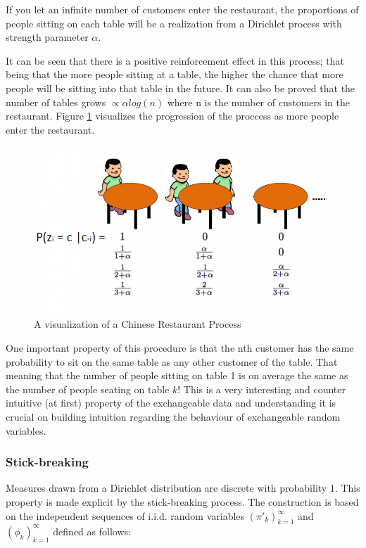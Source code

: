 \documentclass [twoside,hidelinks]{article}
\begin{document}
If you let an infinite number of customers enter the restaurant, the proportions of people sitting on each table will be a realization from a Dirichlet process with strength parameter $\alpha$.

It can be seen that there is a positive reinforcement effect in this process; that being that the more people sitting at a table, the higher the chance that more people will be sitting into that table in the future. It can also be proved that the number of tables grows $ \propto \alpha log (n)$ where n is the number of customers in the restaurant. Figure \ref{CRP} visualizes the progression of the proccess as more people enter the restaurant. 

\begin{figure} [!h]
          \centerline{\includegraphics [width=.70\textwidth]{crp}}
	\caption{A visualization of a Chinese Restaurant Process}
	\label{CRP}
\end{figure}


One important property of this procedure is that the nth customer has the same probability to sit on the same table as any other customer of the table. That meaning that the number of people sitting on table 1 is on average the same as the number of people seating on table $k$! This is a very interesting and counter intuitive (at first) property of the exchangeable data and understanding it is crucial on building intuition regarding the behaviour of exchangeable random variables.

\subsubsection{Stick-breaking}

Measures drawn from a Dirichlet distribution are discrete with probability 1. This property is made explicit by the stick-breaking process. The construction is based on the independent sequences of i.i.d. random variables $ (\pi'_k)_{k=1}^\infty$ and $  ( \phi_k)_{k=1}^\infty$  defined as follows:
\end{document}
